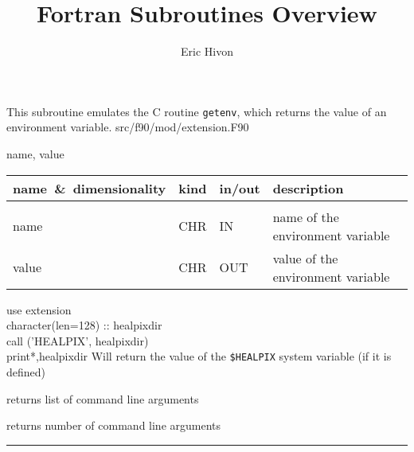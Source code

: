 \sloppy

\title{\healpix Fortran Subroutines Overview}
 \section[getEnvironment]{ }
\label{sub:getenvironment}
\author{Eric Hivon}

\begin{facility}
{This subroutine emulates the C routine {\tt getenv}, which returns the value of
an environment variable.}
{src/f90/mod/extension.F90}
\end{facility}

\begin{f90format}
{name, value}
\end{f90format}

\begin{arguments}
{
\begin{tabular}{p{0.3\hsize} p{0.05\hsize} p{0.1\hsize} p{0.45\hsize}} \hline  
\textbf{name~\&~dimensionality} & \textbf{kind} & \textbf{in/out} & \textbf{description} \\ \hline
                   &   &   &                           \\ %
name & CHR & IN & name of the environment variable \\
value & CHR & OUT & value of the environment variable 
\end{tabular}}
\end{arguments}

\begin{example}
{
use extension \\
character(len=128) :: healpixdir \\
call \thedocid('HEALPIX', healpixdir) \\
print*,healpixdir
}
{
Will return the value of the {\tt \$HEALPIX} system variable (if it is defined)
}
\end{example}

\begin{related}
  \begin{sulist}{} %
  \item[\htmlref{getArgument}{sub:getargument}] returns list of command line arguments
  \item[\htmlref{nArguments}{sub:narguments}] returns number of command line arguments
  \end{sulist}
\end{related}

\rule{\hsize}{2mm}

\newpage
